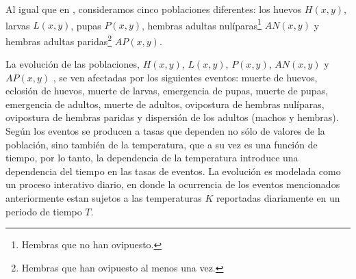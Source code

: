 Al igual que en \citet{otero2006stochastic}, consideramos cinco poblaciones diferentes:
los huevos $H(x,y)$, larvas $L(x,y)$, pupas $P(x,y)$, hembras adultas nulíparas\footnote{Hembras
que no han ovipuesto.} $AN(x,y)$ y hembras adultas paridas\footnote{Hembras que han ovipuesto al
menos una vez.} $AP(x,y)$.

La evolución de las poblaciones, $H(x,y)$, $L(x,y)$, $P(x,y)$, $AN(x,y)$ y $AP(x,y)$ , se ven
afectadas por los siguientes eventos: muerte de huevos, eclosión de huevos, muerte de larvas,
emergencia de pupas, muerte de pupas, emergencia de adultos, muerte de adultos, ovipostura de
hembras nulíparas, ovipostura de hembras paridas y dispersión de los adultos (machos y hembras).
Según \citet{otero2006stochastic} los eventos se producen a tasas que dependen no sólo de valores
de la población, sino también de la temperatura, que a su vez es una función de tiempo, por lo
tanto, la dependencia de la temperatura introduce una dependencia del tiempo en las tasas de
eventos. La evolución es modelada como un proceso interativo diario, en donde la ocurrencia de los
eventos mencionados anteriormente estan sujetos a las temperaturas $K$ reportadas diariamente en
un periodo de tiempo $T$.











